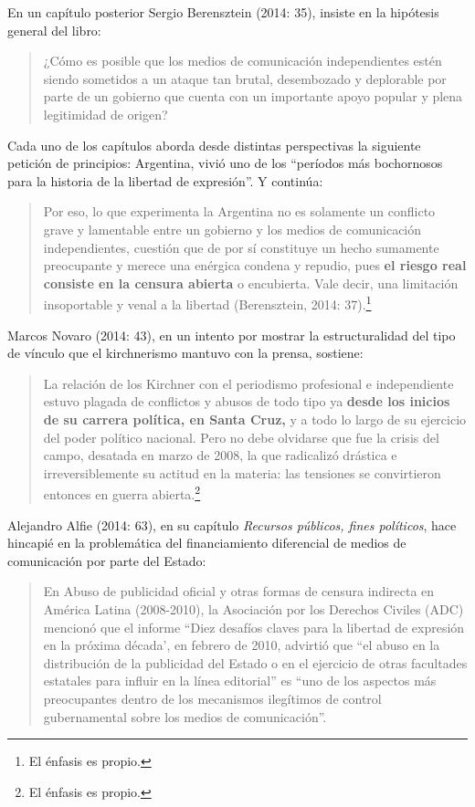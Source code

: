En un capítulo posterior Sergio Berensztein (2014: 35), insiste en la hipótesis general del libro:

\begin{quote}
¿Cómo es posible que los medios de comunicación independientes estén siendo sometidos a un ataque tan brutal, desembozado y deplorable por parte de un gobierno que cuenta con un importante apoyo popular y plena legitimidad de origen?
\end{quote}

Cada uno de los capítulos aborda desde distintas perspectivas la siguiente petición de principios: Argentina, vivió uno de los \enquote{períodos más bochornosos para la historia de la libertad de expresión}. Y continúa:

\begin{quote}
Por eso, lo que experimenta la Argentina no es solamente un conflicto grave y lamentable entre un gobierno y los medios de comunicación independientes, cuestión que de por sí constituye un hecho sumamente preocupante y merece una enérgica condena y repudio, pues \textbf{el riesgo real consiste en la censura abierta} o encubierta. Vale decir, una limitación insoportable y venal a la libertad (Berensztein, 2014: 37).\footnote{El énfasis es propio.}
\end{quote}

Marcos Novaro (2014: 43), en un intento por mostrar la estructuralidad del tipo de vínculo que el kirchnerismo mantuvo con la prensa, sostiene:

\begin{quote}
La relación de los Kirchner con el periodismo profesional e independiente estuvo plagada de conflictos y abusos de todo tipo ya \textbf{desde los inicios de su carrera política, en Santa Cruz,} y a todo lo largo de su ejercicio del poder político nacional. Pero no debe olvidarse que fue la crisis del campo, desatada en marzo de 2008, la que radicalizó drástica e irreversiblemente su actitud en la materia: las tensiones se convirtieron entonces en guerra abierta.\footnote{El énfasis es propio.}
\end{quote}

Alejandro Alfie (2014: 63), en su capítulo \emph{Recursos públicos, fines políticos}, hace hincapié en la problemática del financiamiento diferencial de medios de comunicación por parte del Estado:

\begin{quote}
En Abuso de publicidad oficial y otras formas de censura indirecta en América Latina (2008-2010), la Asociación por los Derechos Civiles (ADC) mencionó que el informe ``Diez desafíos claves para la libertad de expresión en la próxima década', en febrero de 2010, advirtió que \enquote{el abuso en la distribución de la publicidad del Estado o en el ejercicio de otras facultades estatales para influir en la línea editorial} es \enquote{uno de los aspectos más preocupantes dentro de los mecanismos ilegítimos de control gubernamental sobre los medios de comunicación}.
\end{quote}

